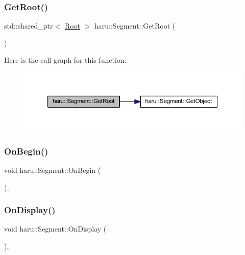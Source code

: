 \subsubsection{\texorpdfstring{Get\+Root()}{GetRoot()}}
{\footnotesize\ttfamily std\+::shared\+\_\+ptr$<$ \mbox{\hyperlink{classharu_1_1_root}{Root}} $>$ haru\+::\+Segment\+::\+Get\+Root (\begin{DoxyParamCaption}{ }\end{DoxyParamCaption})}

Here is the call graph for this function\+:
\nopagebreak
\begin{figure}[H]
\begin{center}
\leavevmode
\includegraphics[width=350pt]{classharu_1_1_segment_adf664884cf9c2b20fc3c8b6944f1ff63_cgraph}
\end{center}
\end{figure}
\mbox{\label{classharu_1_1_segment_aa628559af83f147fbc9d1aa468918e55}} 
\subsubsection{\texorpdfstring{On\+Begin()}{OnBegin()}}
{\footnotesize\ttfamily void haru\+::\+Segment\+::\+On\+Begin (\begin{DoxyParamCaption}{ }\end{DoxyParamCaption})\hspace{0.3cm}{\ttfamily [private]}, {\ttfamily [virtual]}}

\mbox{\label{classharu_1_1_segment_a5bb0f5cf9aecda465804016d3ed4092c}} 
\subsubsection{\texorpdfstring{On\+Display()}{OnDisplay()}}
{\footnotesize\ttfamily void haru\+::\+Segment\+::\+On\+Display (\begin{DoxyParamCaption}{ }\end{DoxyParamCaption})\hspace{0.3cm}{\ttfamily [private]}, {\ttfamily [virtual]}}



